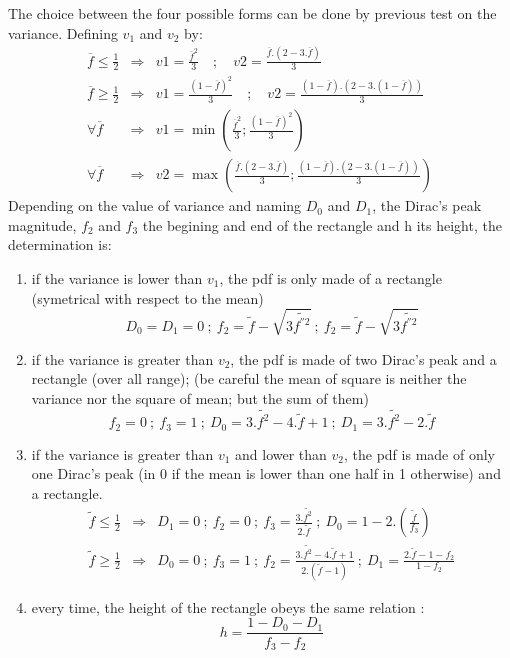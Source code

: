 The choice between the four possible forms can be done by previous test on the
variance. Defining $v_1$ and $v_2$ by:
\begin{eqnarray}
\overline{f} \le \frac{1}{2} &\Rightarrow& v1 = \frac{\overline{f}^2}{3} \quad ; \quad v2 = \frac{\overline{f}.(2-3.\overline{f})}{3}                   \\
\overline{f} \ge \frac{1}{2} &\Rightarrow& v1 = \frac{(1-\overline{f})^2}{3} \quad ; \quad v2 = \frac{(1-\overline{f}).(2-3.(1-\overline{f}))}{3}       \\
\forall \overline{f} &\Rightarrow& v1= \min\left( \frac{\overline{f}^2}{3} ; \frac{(1-\overline{f})^2}{3}\right)                                        \\
\forall \overline{f} &\Rightarrow& v2= \max\left( \frac{\overline{f}.(2-3.\overline{f})}{3} ; \frac{(1-\overline{f}).(2-3.(1-\overline{f}))}{3}\right)
\end{eqnarray}
Depending on the value of variance and naming $D_0$ and $D_1$, the Dirac's peak
magnitude, $f_2$ and $f_3$ the begining and end of the rectangle and h its
height, the determination is:

\begin{enumerate}
\item if the variance is lower than $v_1$, the pdf is only made of a rectangle (symetrical with respect to the mean)
\begin{equation}
D_0 = D_1 = 0 ~;~ f_2 = \tilde{f} - \sqrt{3\widetilde{f^{''2}}} ~;~ f_2 = \tilde{f} - \sqrt{3\widetilde{f^{''2}}}
\end{equation}
\item if the variance is greater than $v_2$, the pdf is made of two Dirac's peak
  and a rectangle (over all range); (be careful the mean of square is neither
  the variance nor the square of mean; but the sum of them)
\begin{equation}
f_2 = 0 ~;~ f_3 = 1 ~;~ D_0 = 3.\widetilde{f^2}-4.\tilde{f}+1 ~;~ D_1 = 3.\widetilde{f^2}-2.\tilde{f}
\end{equation}
\item if the variance is greater than $v_1$ and lower than $v_2$, the pdf is
  made of only one Dirac's peak (in 0 if the mean is lower than one half in 1
  otherwise) and a rectangle.
\begin{eqnarray}
\tilde{f} \le \frac{1}{2} & \Rightarrow & D_1 = 0 ~;~ f_2 = 0 ~;~ f_3 = \frac{3.\widetilde{f^2}}{2.\tilde{f}} ~;~ D_0 = 1-2. \left(\frac{\tilde{f}}{f_3} \right)  \\
\tilde{f} \ge \frac{1}{2} & \Rightarrow & D_0 = 0 ~;~ f_3 = 1 ~;~ f_2 = \frac{3.\widetilde{f^2}-4.\tilde{f}+1}{2.(\tilde{f}-1)} ~;~ D_1 = \frac{2.\tilde{f}-1-f_2}{1-f_2} \nonumber
\end{eqnarray}
\item every time, the height of the rectangle obeys the same relation :
\begin{equation}
h = \frac{1-D_0-D_1}{f_3-f_2}
\end{equation}
\end{enumerate}

